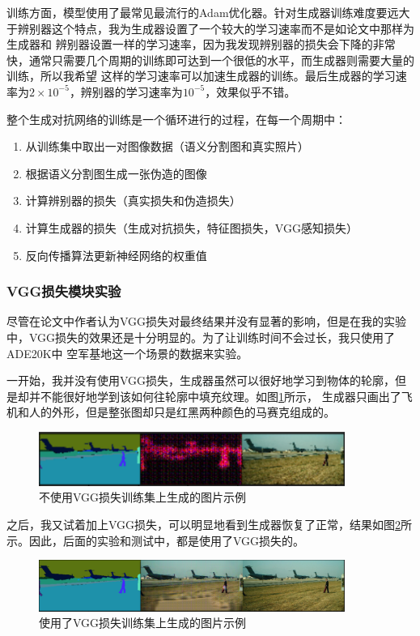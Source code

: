 \documentclass[supercite]{HustGraduPaper}
\theoremstyle{definition}
\begin{document}
训练方面，模型使用了最常见最流行的Adam优化器。针对生成器训练难度要远大于辨别器这个特点，我为生成器设置了一个较大的学习速率而不是如论文中那样为生成器和
辨别器设置一样的学习速率，因为我发现辨别器的损失会下降的非常快，通常只需要几个周期的训练即可达到一个很低的水平，而生成器则需要大量的训练，所以我希望
这样的学习速率可以加速生成器的训练。最后生成器的学习速率为$2\times10^{-5}$，辨别器的学习速率为$10^{-5}$，效果似乎不错。

整个生成对抗网络的训练是一个循环进行的过程，在每一个周期中：
\begin{enumerate}
  \item 从训练集中取出一对图像数据（语义分割图和真实照片）
  \item 根据语义分割图生成一张伪造的图像
  \item 计算辨别器的损失（真实损失和伪造损失）
  \item 计算生成器的损失（生成对抗损失，特征图损失，VGG感知损失）
  \item 反向传播算法更新神经网络的权重值
\end{enumerate}

\subsubsection{VGG损失模块实验}

尽管在论文中作者认为VGG损失对最终结果并没有显著的影响，但是在我的实验中，VGG损失的效果还是十分明显的。为了让训练时间不会过长，我只使用了ADE20K中
空军基地这一个场景的数据来实验。

一开始，我并没有使用VGG损失，生成器虽然可以很好地学习到物体的轮廓，但是却并不能很好地学到该如何往轮廓中填充纹理。如图\ref{fig:without-VGG}所示，
生成器只画出了飞机和人的外形，但是整张图却只是红黑两种颜色的马赛克组成的。
\begin{figure}[H]
  \begin{center}
  \includegraphics[width=10cm]{images/without-VGG}
  \end{center}
  \caption{不使用VGG损失训练集上生成的图片示例}
  \label{fig:without-VGG}
\end{figure}

之后，我又试着加上VGG损失，可以明显地看到生成器恢复了正常，结果如图\ref{fig:with-VGG}所示。因此，后面的实验和测试中，都是使用了VGG损失的。
\begin{figure}[H]
  \begin{center}
  \includegraphics[width=10cm]{images/with-VGG}
  \end{center}
  \caption{使用了VGG损失训练集上生成的图片示例}
  \label{fig:with-VGG}
\end{figure}
\end{document}

